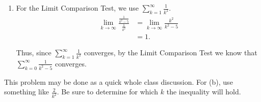 \documentclass[noinstructornotes]{ximera}
\begin{document}
\begin{problem}
\begin{freeResponse}
\begin{enumerate}
		
		
		\item  For the Limit Comparison Test, we  use $\sum_{k=1}^\infty \frac{1}{k^2}$.  
			\begin{align*}
			\lim_{k \to \infty} \frac{\frac{1}{k^2-5}}{\frac{1}{k^2}}
			&= \lim_{k \to \infty} \frac{k^2}{k^2-5}  \\
			&= 1.
			\end{align*}
			
		Thus, since $\sum_{k=1}^\infty \frac{1}{k^2}$ converges, by the Limit Comparison Test we know that $\sum_{k=0}^\infty \frac{1}{k^2-5}$ converges.
		
		\end{enumerate}
	\end{freeResponse}

\end{problem}

\begin{instructorNotes}
This problem may be done as a quick whole class discussion.  
For (b), use something like $\frac{2}{k^2}$.  
Be sure to determine for which $k$ the inequality will hold.
\end{instructorNotes}
\end{document}
